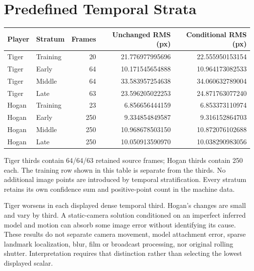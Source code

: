 \documentclass[11pt]{article}
\begin{document}
\section*{Predefined Temporal Strata}
\begin{center}\small\begin{tabular}{llrrr}\toprule
Player & Stratum & Frames & Unchanged RMS (px) & Conditional RMS (px)\\\midrule
Tiger & Training & 20 & 21.776977995696 & 22.555950153154 \\
Tiger & Early & 64 & 10.171545654888 & 10.964173082533 \\
Tiger & Middle & 64 & 33.583957254638 & 34.060632789004 \\
Tiger & Late & 63 & 23.596205022253 & 24.871763077240 \\
Hogan & Training & 23 & 6.856656444159 & 6.853373110974 \\
Hogan & Early & 250 & 9.334854849587 & 9.316152864703 \\
Hogan & Middle & 250 & 10.968678503150 & 10.872076102688 \\
Hogan & Late & 250 & 10.050913590970 & 10.038290983056 \\
\bottomrule\end{tabular}\end{center}
Tiger thirds contain 64/64/63 retained source frames; Hogan thirds contain 250 each. The training row shown in this table is separate from the thirds. No additional image points are introduced by temporal stratification. Every stratum retains its own confidence sum and positive-point count in the machine data.

Tiger worsens in each displayed dense temporal third. Hogan's changes are small and vary by third. A static-camera solution conditioned on an imperfect inferred model and motion can absorb some image error without identifying its cause. These results do not separate camera movement, model attachment error, sparse landmark localization, blur, film or broadcast processing, nor original rolling shutter. Interpretation requires that distinction rather than selecting the lowest displayed scalar.
\newpage
\end{document}
